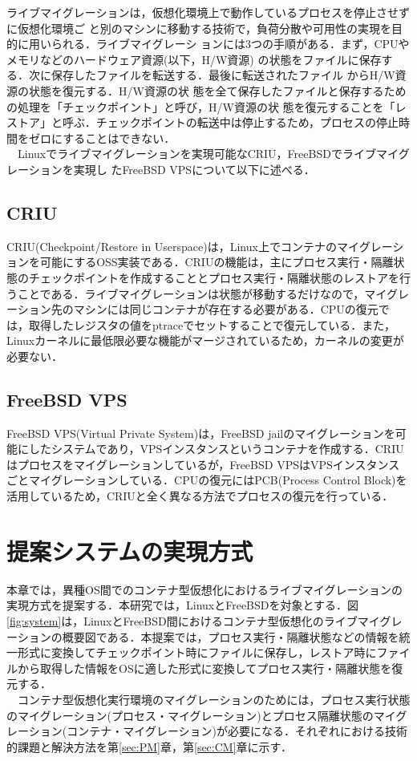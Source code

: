 \documentclass[11pt]{jarticle}
\begin{document}
ライブマイグレーションは，仮想化環境上で動作しているプロセスを停止させずに仮想化環境ご
と別のマシンに移動する技術で，負荷分散や可用性の実現を目的に用いられる．ライブマイグレーシ
ョンには3つの手順がある．まず，CPUやメモリなどのハードウェア資源(以下，H/W資源)
の状態をファイルに保存する．次に保存したファイルを転送する．最後に転送されたファイル
からH/W資源の状態を復元する．H/W資源の状
態を全て保存したファイルと保存するための処理を「チェックポイント」と呼び，H/W資源の状
態を復元することを「レストア」と呼ぶ．チェックポイントの転送中は停止するため，プロセスの停止時間をゼロにすることはできない．\\
　Linuxでライブマイグレーションを実現可能なCRIU，FreeBSDでライブマイグレーションを実現し
たFreeBSD VPSについて以下に述べる．

\subsection{CRIU}
\label{sec:CRIU}
CRIU(Checkpoint/Restore in Userspace)は，Linux上でコンテナのマイグレーションを可能にするOSS実装である．CRIUの機能は，主にプロセス実行・隔離状態のチェックポイントを作成することとプロセス実行・隔離状態のレストアを行うことである．ライブマイグレーションは状態が移動するだけなので，マイグレーション先のマシンには同じコンテナが存在する必要がある．CPUの復元では，取得したレジスタの値をptraceでセットすることで復元している．また，Linuxカーネルに最低限必要な機能がマージされているため，カーネルの変更が必要ない．

\subsection{FreeBSD VPS}
\label{sec:FreeBSD VPS}
FreeBSD VPS(Virtual Private System)は，FreeBSD jailのマイグレーションを可能にしたシステムであり，VPSインスタンスというコンテナを作成する．CRIUはプロセスをマイグレーションしているが，FreeBSD VPSはVPSインスタンスごとマイグレーションしている．CPUの復元にはPCB(Process Control Block)を活用しているため，CRIUと全く異なる方法でプロセスの復元を行っている．

\section{提案システムの実現方式}
\label{sec:suggest}
本章では，異種OS間でのコンテナ型仮想化におけるライブマイグレーションの実現方式を提案する．本研究では，LinuxとFreeBSDを対象とする．図\ref{fig:system}は，LinuxとFreeBSD間におけるコンテナ型仮想化のライブマイグレーションの概要図である．本提案では，プロセス実行・隔離状態などの情報を統一形式に変換してチェックポイント時にファイルに保存し，レストア時にファイルから取得した情報をOSに適した形式に変換してプロセス実行・隔離状態を復元する．\\
　コンテナ型仮想化実行環境のマイグレーションのためには，プロセス実行状態のマイグレーション(プロセス・マイグレーション)とプロセス隔離状態のマイグレーション(コンテナ・マイグレーション)が必要になる．それぞれにおける技術的課題と解決方法を第\ref{sec:PM}章，第\ref{sec:CM}章に示す．
\end{document}
